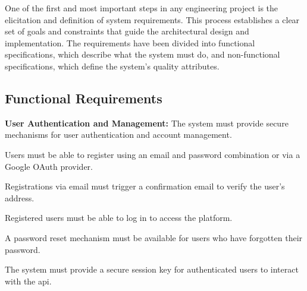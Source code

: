 One of the first and most important steps in any engineering project is the elicitation and definition of system requirements. This process establishes a clear set of goals and constraints that guide the architectural design and implementation. The requirements have been divided into functional specifications, which describe what the system must do, and non-functional specifications, which define the system's quality attributes.

\subsection{Functional Requirements}
\begin{functionalmod}[AUTH]
    \item \textbf{User Authentication and Management:} The system must provide secure mechanisms for user authentication and account management.
    \begin{functionalmod}
        \item Users must be able to register using an email and password combination or via a Google OAuth provider.
        \item Registrations via email must trigger a confirmation email to verify the user's address.
        \item Registered users must be able to log in to access the platform.
        \item A password reset mechanism must be available for users who have forgotten their password.
        \item The system must provide a secure session key for authenticated users to interact with the \acs{api}.
    \end{functionalmod}
\end{functionalmod}

